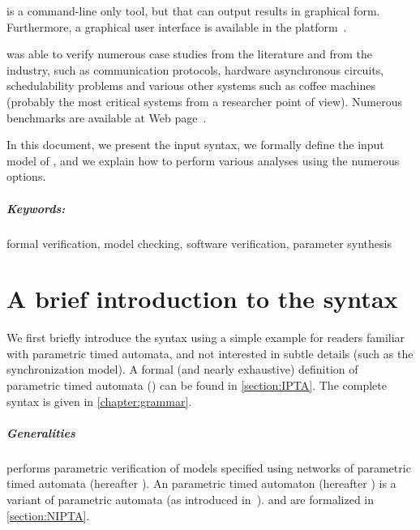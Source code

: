\imitator{} is a command-line only tool, but that can output results in graphical form.
Furthermore, a graphical user interface is available in the \CosyVerif{} platform~\cite{AHHKLLP13}.

\imitator{} was able to verify numerous case studies from the literature and from the industry, such as communication protocols, hardware asynchronous circuits, schedulability problems and various other systems such as coffee machines (probably the most critical systems from a researcher point of view).
Numerous benchmarks are available at \imitator{} Web page~\cite{imitator}.

In this document, we present the input syntax, we formally define the input model of \imitator{}, and we explain how to perform various analyses using the numerous options.


\paragraph{Keywords:} formal verification, model checking, software verification, parameter synthesis


\chapter{A brief introduction to the syntax}

We first briefly introduce the syntax using a simple example for readers familiar with parametric timed automata, and not interested in subtle details (such as the synchronization model).
A formal (and nearly exhaustive) definition of \imitator{} parametric timed automata (\NIPTA{}) can be found in \cref{section:IPTA}.
The complete syntax is given in \cref{chapter:grammar}.

\paragraph{Generalities}
\imitator{} performs parametric verification of models specified using networks of \imitator{} parametric timed automata (hereafter \NIPTA{}).
An \imitator{} parametric timed automaton (hereafter \IPTA{}) is a variant of parametric automata (as introduced in~\cite{AHV93}).
\IPTA{} and \NIPTA{} are formalized in \cref{section:NIPTA}.

